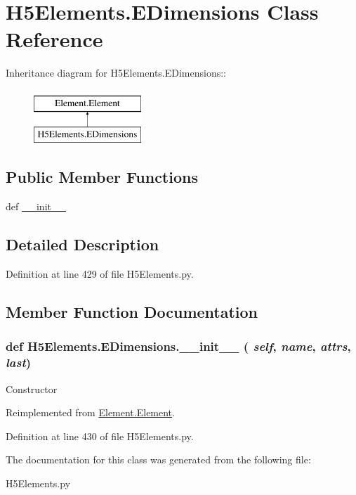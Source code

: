 \hypertarget{classH5Elements_1_1EDimensions}{
\section{H5Elements.EDimensions Class Reference}
\label{classH5Elements_1_1EDimensions}
}
Inheritance diagram for H5Elements.EDimensions::\begin{figure}[H]
\begin{center}
\leavevmode
\includegraphics[height=2cm]{classH5Elements_1_1EDimensions}
\end{center}
\end{figure}
\subsection*{Public Member Functions}
\begin{DoxyCompactItemize}
\item 
def \hyperlink{classH5Elements_1_1EDimensions_ac573211ddcc848f54103d9c68c903e6c}{\_\-\_\-init\_\-\_\-}
\end{DoxyCompactItemize}


\subsection{Detailed Description}


Definition at line 429 of file H5Elements.py.

\subsection{Member Function Documentation}
\hypertarget{classH5Elements_1_1EDimensions_ac573211ddcc848f54103d9c68c903e6c}{
\subsubsection[{\_\-\_\-init\_\-\_\-}]{\setlength{\rightskip}{0pt plus 5cm}def H5Elements.EDimensions.\_\-\_\-init\_\-\_\- ( {\em self}, \/   {\em name}, \/   {\em attrs}, \/   {\em last})}}
\label{classH5Elements_1_1EDimensions_ac573211ddcc848f54103d9c68c903e6c}
\begin{DoxyVerb}Constructor \end{DoxyVerb}
 

Reimplemented from \hyperlink{classElement_1_1Element_a359371465b7c4d21611adec7e86c3b33}{Element.Element}.

Definition at line 430 of file H5Elements.py.

The documentation for this class was generated from the following file:\begin{DoxyCompactItemize}
\item 
H5Elements.py\end{DoxyCompactItemize}

